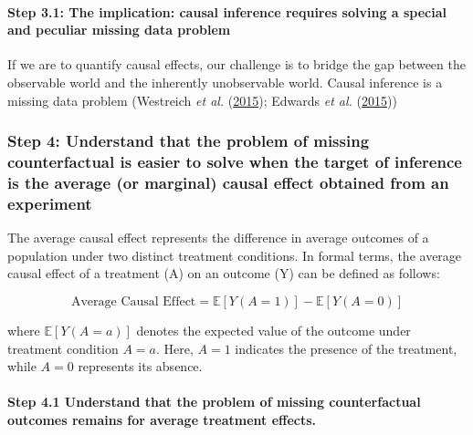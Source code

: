 \documentclass[
  singlecolumn]{article}
\let\oldparagraph\paragraph
\renewcommand{\paragraph}[1]{\oldparagraph{#1}\mbox{}}
\begin{document}
\hypertarget{step-3.1-the-implication-causal-inference-requires-solving-a-special-and-peculiar-missing-data-problem}{%
\paragraph{\texorpdfstring{\textbf{Step 3.1: The implication: causal
inference requires solving a special and peculiar missing data
problem}}{Step 3.1: The implication: causal inference requires solving a special and peculiar missing data problem}}\label{step-3.1-the-implication-causal-inference-requires-solving-a-special-and-peculiar-missing-data-problem}}

If we are to quantify causal effects, our challenge is to bridge the gap
between the observable world and the inherently unobservable world.
Causal inference is a missing data problem (Westreich \emph{et al.}
(\protect\hyperlink{ref-westreich2015}{2015}); Edwards \emph{et al.}
(\protect\hyperlink{ref-edwards2015}{2015}))

\hypertarget{step-4-understand-that-the-problem-of-missing-counterfactual-is-easier-to-solve-when-the-target-of-inference-is-the-average-or-marginal-causal-effect-obtained-from-an-experiment}{%
\subsubsection{Step 4: Understand that the problem of missing
counterfactual is easier to solve when the target of inference is the
average (or marginal) causal effect obtained from an
experiment}\label{step-4-understand-that-the-problem-of-missing-counterfactual-is-easier-to-solve-when-the-target-of-inference-is-the-average-or-marginal-causal-effect-obtained-from-an-experiment}}

The average causal effect represents the difference in average outcomes
of a population under two distinct treatment conditions. In formal
terms, the average causal effect of a treatment (A) on an outcome (Y)
can be defined as follows:

\[
\text{Average Causal Effect} = \mathbb{E}[Y(A = 1)] - \mathbb{E}[Y(A = 0)]
\]

where \(\mathbb{E}[Y(A = a)]\) denotes the expected value of the outcome
under treatment condition \(A = a\). Here, \(A = 1\) indicates the
presence of the treatment, while \(A = 0\) represents its absence.

\hypertarget{step-4.1-understand-that-the-problem-of-missing-counterfactual-outcomes-remains-for-average-treatment-effects.}{%
\paragraph{Step 4.1 Understand that the problem of missing
counterfactual outcomes remains for average treatment
effects.}\label{step-4.1-understand-that-the-problem-of-missing-counterfactual-outcomes-remains-for-average-treatment-effects.}}
\end{document}

